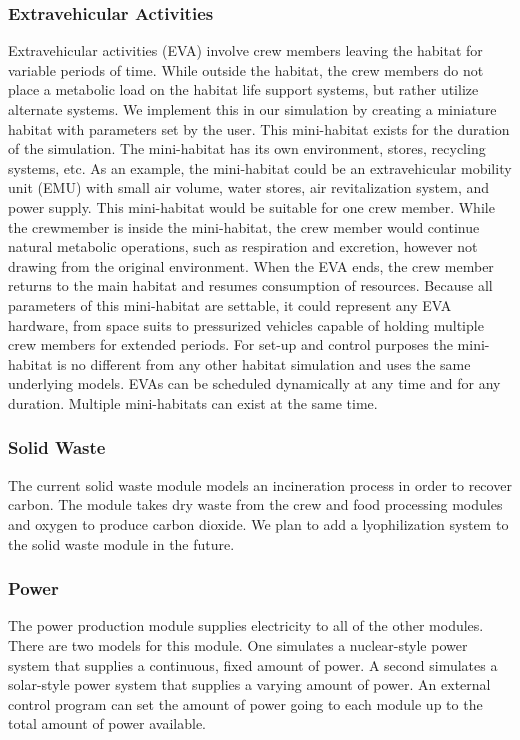 \documentclass[submit]{aiaa}
\begin{document}
\subsubsection{Extravehicular Activities}
\label{sec:eva}

Extravehicular activities (EVA) involve crew members leaving the
habitat for variable periods of time.  
While outside the habitat, the crew members do not place a metabolic
load on the habitat life support systems, but rather utilize
alternate systems.   
We implement this in our simulation by creating a miniature habitat with
parameters set by the user.  This mini-habitat exists for the
duration of the simulation.  The mini-habitat has its own environment,
stores, recycling systems, etc.  
As an example, the mini-habitat could be an extravehicular mobility
unit (EMU) with small air volume,  water stores,  air
revitalization system, and power supply.  
This mini-habitat would be suitable for one crew member.  
While the crewmember is inside the mini-habitat, the crew member would continue natural metabolic operations, such as respiration and excretion, however not drawing from the original environment.   
When the EVA ends, the crew member returns to the main habitat and resumes consumption of resources.   
Because all parameters of this mini-habitat are
settable, it could represent any EVA hardware, from space suits to
pressurized vehicles capable of holding multiple crew members for
extended periods.  For set-up and control purposes the mini-habitat is
no different from any other habitat simulation and uses the same
underlying models.  EVAs can be scheduled dynamically at any time and
for any duration.  Multiple mini-habitats can exist at the same
time.

\subsubsection{Solid Waste}

The current solid waste module models an incineration process in order
to recover carbon.  The module takes dry waste from the crew and food
processing modules and oxygen to produce carbon dioxide.  We plan to
add a lyophilization system to the solid waste module in the future.

\subsubsection{Power}

The power production module supplies electricity to all of the other
modules.  There are two models for this module.  One simulates a
nuclear-style power system that supplies a continuous, fixed amount of
power.  A second simulates a solar-style power system that supplies a
varying amount of power.  An external control program can set the
amount of power going to each module up to the total amount of power
available.  
\end{document}
